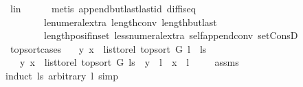 \begin{isabellebody}
\ l{\isacharunderscore}{\kern0pt}in\isanewline
\ \ \ \ \isamarkupfalse%
\ {\isacharparenleft}{\kern0pt}metis\ append{\isacharunderscore}{\kern0pt}butlast{\isacharunderscore}{\kern0pt}last{\isacharunderscore}{\kern0pt}id\ diff{\isacharunderscore}{\kern0pt}is{\isacharunderscore}{\kern0pt}{}{\isacharunderscore}{\kern0pt}eq{\isacharprime}{\kern0pt}\isanewline
\ \ \ \ \ \ \ \ le{\isacharunderscore}{\kern0pt}numeral{\isacharunderscore}{\kern0pt}extra{\isacharparenleft}{\kern0pt}{}{\isacharparenright}{\kern0pt}\ length{\isacharunderscore}{\kern0pt}{}{\isacharunderscore}{\kern0pt}conv\ length{\isacharunderscore}{\kern0pt}butlast\isanewline
\ \ \ \ \ \ \ \ length{\isacharunderscore}{\kern0pt}pos{\isacharunderscore}{\kern0pt}if{\isacharunderscore}{\kern0pt}in{\isacharunderscore}{\kern0pt}set\ less{\isacharunderscore}{\kern0pt}numeral{\isacharunderscore}{\kern0pt}extra{\isacharparenleft}{\kern0pt}{}{\isacharparenright}{\kern0pt}\ self{\isacharunderscore}{\kern0pt}append{\isacharunderscore}{\kern0pt}conv{}\ set{\isacharunderscore}{\kern0pt}ConsD{\isacharparenright}{\kern0pt}\ \isanewline
{}\isamarkupfalse%
%
\endisatagproof
{\isafoldproof}%
%
\isadelimproof
\isanewline
%
\endisadelimproof
\isanewline
{}\isamarkupfalse%
\ top{\isacharunderscore}{\kern0pt}sort{\isacharunderscore}{\kern0pt}cases{\isacharcolon}{\kern0pt}\isanewline
\ \ \ {\isachardoublequoteopen}{\isacharparenleft}{\kern0pt}y{\isacharcomma}{\kern0pt}\ x{\isacharparenright}{\kern0pt}\ {\isasymin}\ list{\isacharunderscore}{\kern0pt}to{\isacharunderscore}{\kern0pt}rel\ {\isacharparenleft}{\kern0pt}top{\isacharunderscore}{\kern0pt}sort\ G\ {\isacharparenleft}{\kern0pt}l\ {\isacharhash}{\kern0pt}\ ls{\isacharparenright}{\kern0pt}{\isacharparenright}{\kern0pt}{\isachardoublequoteclose}\isanewline
\ \ \ {\isachardoublequoteopen}{\isacharparenleft}{\kern0pt}y{\isacharcomma}{\kern0pt}\ x{\isacharparenright}{\kern0pt}\ {\isasymin}\ list{\isacharunderscore}{\kern0pt}to{\isacharunderscore}{\kern0pt}rel\ {\isacharparenleft}{\kern0pt}top{\isacharunderscore}{\kern0pt}sort\ G\ ls{\isacharparenright}{\kern0pt}\ {\isasymor}\ y\ {\isacharequal}{\kern0pt}\ l\ {\isasymor}\ x\ {\isacharequal}{\kern0pt}\ l{\isachardoublequoteclose}\ \isanewline
%
\isadelimproof
\ \ %
\endisadelimproof
%
\isatagproof
{}\isamarkupfalse%
\ assms\isanewline
{}\isamarkupfalse%
{\isacharparenleft}{\kern0pt}induct\ ls\ arbitrary{\isacharcolon}{\kern0pt}\ l{\isacharcomma}{\kern0pt}\ simp{\isacharparenright}{\kern0pt}\isanewline

\end{isabellebody}
